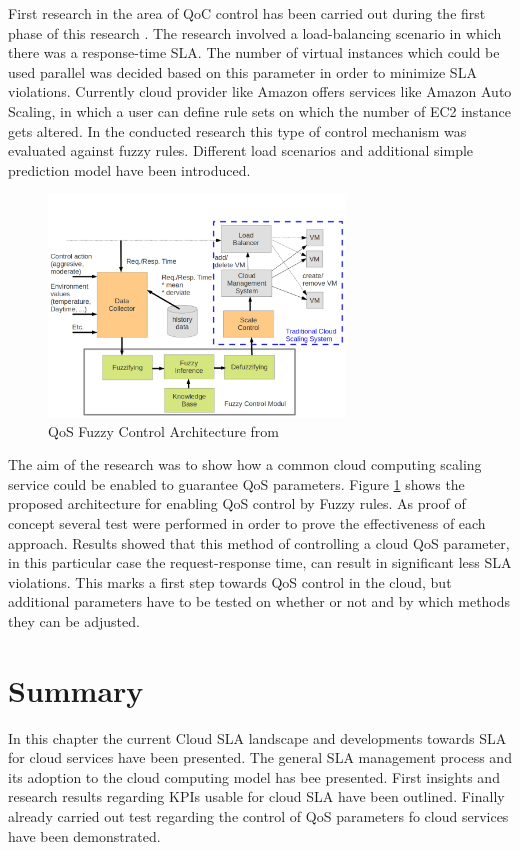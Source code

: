 First research in the area of QoC control has been carried out during the first phase of this research \cite{fuzzyQoS}. The research involved a load-balancing scenario in which there was a response-time SLA. The number of virtual instances which could be used parallel was decided based on this parameter in order to minimize SLA violations. Currently cloud provider like Amazon offers services like  Amazon Auto Scaling, in which a user can define rule sets on which the number of EC2 instance gets altered. In the conducted research this type of control mechanism was evaluated against fuzzy rules. Different load scenarios and additional simple prediction model have been introduced.

 \begin{figure}[ht]
 \begin{center}
 \includegraphics[width=0.7\textwidth]{chapters/chapter3/fig/architecture.png}
 \caption{QoS Fuzzy Control Architecture from \cite{fuzzyQoS} }
 \label{fig:fuzzy}
 \end{center}
 \end{figure}

 The aim of the research was to show how a common cloud computing scaling service could be enabled to guarantee QoS parameters. Figure \ref{fig:fuzzy} shows the proposed architecture for enabling QoS control by Fuzzy rules. As proof of concept several test were performed in order to prove the effectiveness of each approach. Results showed that this method of controlling a cloud QoS parameter, in this particular case the request-response time, can result in significant less SLA violations. This marks a first step towards QoS control in the cloud, but additional parameters have to be tested on whether or not and by which methods they can be adjusted.

 
 
  \section{Summary}
In this chapter the current Cloud SLA landscape and developments towards SLA for cloud services have been presented. The general SLA management process and its adoption to the cloud computing model has bee presented. First insights and research results regarding KPIs usable for cloud SLA have been outlined. Finally already carried out test regarding the control of QoS parameters fo cloud services have been demonstrated.